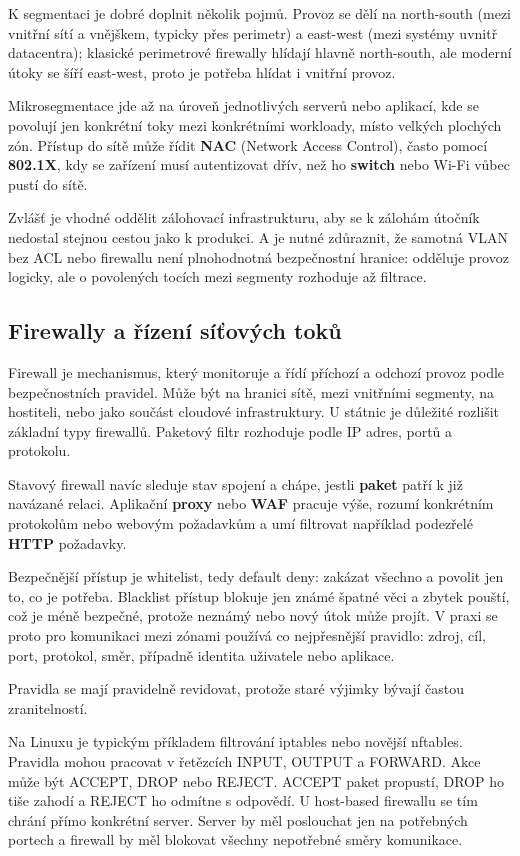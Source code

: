 K segmentaci je dobré doplnit několik pojmů. Provoz se dělí na north-south (mezi vnitřní sítí a vnějškem, typicky přes perimetr) a east-west (mezi systémy uvnitř datacentra); klasické perimetrové firewally hlídají hlavně north-south, ale moderní útoky se šíří east-west, proto je potřeba hlídat i vnitřní provoz.

Mikrosegmentace jde až na úroveň jednotlivých serverů nebo aplikací, kde se povolují jen konkrétní toky mezi konkrétními workloady, místo velkých plochých zón. Přístup do sítě může řídit \textbf{NAC} (Network Access Control), často pomocí \textbf{802.1X}, kdy se zařízení musí autentizovat dřív, než ho \textbf{switch} nebo Wi-Fi vůbec pustí do sítě.

Zvlášť je vhodné oddělit zálohovací infrastrukturu, aby se k zálohám útočník nedostal stejnou cestou jako k produkci. A je nutné zdůraznit, že samotná VLAN bez ACL nebo firewallu není plnohodnotná bezpečnostní hranice: odděluje provoz logicky, ale o povolených tocích mezi segmenty rozhoduje až filtrace.

\subsection*{Firewally a řízení síťových toků}

Firewall je mechanismus, který monitoruje a řídí příchozí a odchozí provoz podle bezpečnostních pravidel. Může být na hranici sítě, mezi vnitřními segmenty, na hostiteli, nebo jako součást cloudové infrastruktury. U státnic je důležité rozlišit základní typy firewallů. Paketový filtr rozhoduje podle IP adres, portů a protokolu.

Stavový firewall navíc sleduje stav spojení a chápe, jestli \textbf{paket} patří k již navázané relaci. Aplikační \textbf{proxy} nebo \textbf{WAF} pracuje výše, rozumí konkrétním protokolům nebo webovým požadavkům a umí filtrovat například podezřelé \textbf{HTTP} požadavky.

Bezpečnější přístup je whitelist, tedy default deny: zakázat všechno a povolit jen to, co je potřeba. Blacklist přístup blokuje jen známé špatné věci a zbytek pouští, což je méně bezpečné, protože neznámý nebo nový útok může projít. V praxi se proto pro komunikaci mezi zónami používá co nejpřesnější pravidlo: zdroj, cíl, port, protokol, směr, případně identita uživatele nebo aplikace.

Pravidla se mají pravidelně revidovat, protože staré výjimky bývají častou zranitelností.

Na Linuxu je typickým příkladem filtrování iptables nebo novější nftables. Pravidla mohou pracovat v řetězcích INPUT, OUTPUT a FORWARD. Akce může být ACCEPT, DROP nebo REJECT. ACCEPT paket propustí, DROP ho tiše zahodí a REJECT ho odmítne s odpovědí. U host-based firewallu se tím chrání přímo konkrétní server. Server by měl poslouchat jen na potřebných portech a firewall by měl blokovat všechny nepotřebné směry komunikace.

